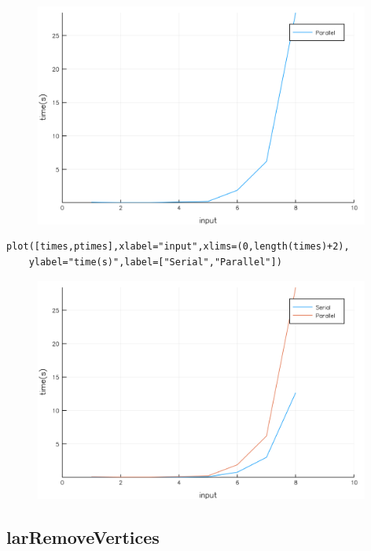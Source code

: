 \documentclass[a4paper,12pt]{article}
\begin{document}
\begin{figure}[ht!]
\centering
\includegraphics[width=11cm,scale=0.3]{struct2larParallel.png}
\end{figure}
\newpage
\begin{verbatim}
plot([times,ptimes],xlabel="input",xlims=(0,length(times)+2),
    ylabel="time(s)",label=["Serial","Parallel"])
\end{verbatim}
\begin{figure}[ht!]
\centering
\includegraphics[width=11cm,scale=0.3]{struct2larC.png}
\end{figure}
\newpage
\subsection{larRemoveVertices}
\end{document}
